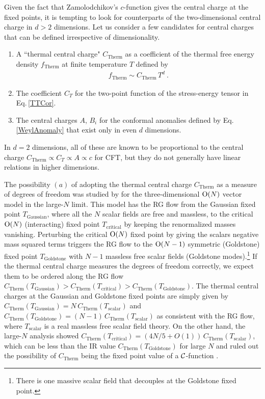 Given the fact that Zamolodchikov's $c$-function gives the central charge at the fixed points, it is tempting to look for counterparts of the two-dimensional central charge in $d>2$ dimensions.
Let us consider a few candidates for central charges that can be defined irrespective of dimensionality.
\begin{enumerate}
\item[$(a)$]
A ``thermal central charge" $C_\text{Therm}$ as a coefficient of the thermal free energy density $f_\text{Therm}$ at finite temperature $T$ defined by
\begin{align}\label{Thermal_C}
	f_\text{Therm} \sim C_\text{Therm}\, T^d  \ .
\end{align}
\item[$(b)$]
The coefficient $C_T$ for the two-point function of the stress-energy tensor in Eq.\,\eqref{TTCor}.
\item[$(c)$]
The central charges $A$, $B_i$ for the conformal anomalies defined by Eq.\,\eqref{WeylAnomaly} that exist only in even $d$ dimensions.
\end{enumerate}
In $d=2$ dimensions, all of these are known to be proportional to the central charge $C_\text{Therm} \propto C_T \propto A \propto c$ for CFT, but they do not generally have linear relations in higher dimensions.

The possibility $(a)$ of adopting the thermal central charge $C_\text{Therm}$ as a measure of degrees of freedom was studied by \textcite{Sachdev:1993pr} for the three-dimensional $\mathrm{O}(N)$ vector model in the large-$N$ limit.
This model has the RG flow from the Gaussian fixed point $T_\text{Gaussian}$, where all the $N$ scalar fields are free and massless, to the critical $\mathrm{O}(N)$ (interacting) fixed point $T_\text{critical}$ by keeping the renormalized masses vanishing.
Perturbing the critical $\mathrm{O}(N)$ fixed point by giving the scalars negative mass squared terms triggers the RG flow to the $\mathrm{O}(N-1)$ symmetric (Goldstone) fixed point $T_\text{Goldstone}$ with $N-1$ massless free scalar fields (Goldstone modes).\footnote{There is one massive scalar field that decouples at the Goldstone fixed point.}
If the thermal central charge measures the degrees of freedom correctly, we expect them to be ordered along the RG flow $C_\text{Therm} (T_\text{Gaussian}) > C_\text{Therm} (T_\text{critical}) > C_\text{Therm} (T_\text{Goldstone})$.
The thermal central charges at the Gaussian and Goldstone fixed points are simply given by $C_\text{Therm} (T_\text{Gaussian}) = N\,C_\text{Therm}(T_\text{scalar})$ and $C_\text{Therm} (T_\text{Goldstone}) = (N -1)\,C_\text{Therm}(T_\text{scalar})$ as consistent with the RG flow, where  $T_\text{scalar}$ is a real massless free scalar field theory.
On the other hand, the large-$N$ analysis showed $C_\text{Therm} (T_\text{critical}) = \left(4N/5 + O(1)\right)\,C_\text{Therm}(T_\text{scalar})$, which can be less than the IR value $C_\text{Therm} (T_\text{Goldstone})$ for large $N$ and ruled out the possibility of $C_\text{Therm}$ being the fixed point value of a ${\cal C}$-function \cite{Sachdev:1993pr}.

